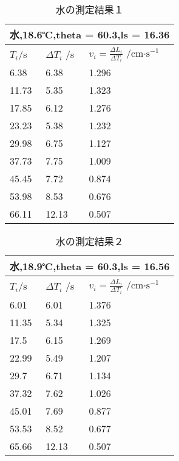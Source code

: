 \documentclass{jsarticle}
\begin{document}
\begin{table}[H]
\centering
\caption{水の測定結果１}
\label{my-label}
\begin{tabular}{|l|l|l|}
\hline
\multicolumn{3}{|l|}{水,18.6℃,theta = 60.3,ls = 16.36} \\ \hline
$T_i $/s   & $\Delta T_i $ /s  & $v_i = \frac{\Delta L_i}{\Delta T_i}$ /cm$\cdot \textrm{s}^{-1}$   \\ \hline
6.38           & 6.38           & 1.296         \\ \hline
11.73          & 5.35           & 1.323         \\ \hline
17.85          & 6.12           & 1.276         \\ \hline
23.23          & 5.38           & 1.232         \\ \hline
29.98          & 6.75           & 1.127         \\ \hline
37.73          & 7.75           & 1.009         \\ \hline
45.45          & 7.72           & 0.874         \\ \hline
53.98          & 8.53           & 0.676         \\ \hline
66.11          & 12.13          & 0.507         \\ \hline
\end{tabular}
\end{table}

\begin{table}[H]
\centering
\caption{水の測定結果２}
\label{my-label}
\begin{tabular}{|l|l|l|}
\hline
\multicolumn{3}{|l|}{水,18.9℃,theta = 60.3,ls = 16.56} \\ \hline
$T_i $/s   & $\Delta T_i $ /s  & $v_i = \frac{\Delta L_i}{\Delta T_i}$ /cm$\cdot \textrm{s}^{-1}$   \\ \hline
6.01           & 6.01           & 1.376         \\ \hline
11.35          & 5.34           & 1.325         \\ \hline
17.5           & 6.15           & 1.269         \\ \hline
22.99          & 5.49           & 1.207         \\ \hline
29.7           & 6.71           & 1.134         \\ \hline
37.32          & 7.62           & 1.026         \\ \hline
45.01          & 7.69           & 0.877         \\ \hline
53.53          & 8.52           & 0.677         \\ \hline
65.66          & 12.13          & 0.507         \\ \hline
\end{tabular}
\end{table}
\end{document}

